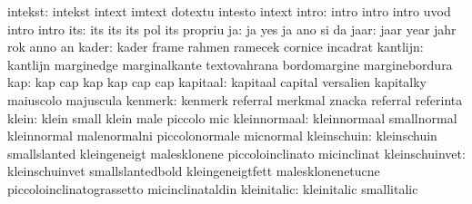                   intekst: intekst                   intext
                           imtext                    dotextu
                           intesto                   intext
                    intro: intro                     intro
                           intro                     uvod
                           intro                     intro
                      its: its                       its
                           its                       pol
                           its                       propriu %
                       ja: ja                        yes
                           ja                        ano
                           si                        da
                     jaar: jaar                      year
                           jahr                      rok
                           anno                      an
                    kader: kader                     frame
                           rahmen                    ramecek
                           cornice                   incadrat
                 kantlijn: kantlijn                  marginedge
                           marginalkante             textovahrana
                           bordomargine              marginebordura
                      kap: kap                       cap
                           kap                       kap
                           cap                       cap
                 kapitaal: kapitaal                  capital
                           versalien                 kapitalky
                           maiuscolo                 majuscula
                  kenmerk: kenmerk                   referral
                           merkmal                   znacka
                           referral                  referinta
                    klein: klein                     small
                           klein                     male
                           piccolo                   mic
             kleinnormaal: kleinnormaal              smallnormal
                           kleinnormal               malenormalni
                           piccolonormale            micnormal
              kleinschuin: kleinschuin               smallslanted
                           kleingeneigt              malesklonene
                           piccoloinclinato          micinclinat
           kleinschuinvet: kleinschuinvet            smallslantedbold
                           kleingeneigtfett          malesklonenetucne
                           piccoloinclinatograssetto micinclinataldin
              kleinitalic: kleinitalic               smallitalic

